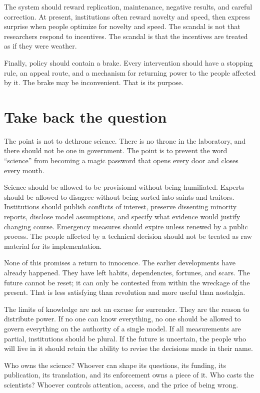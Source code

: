 ﻿\documentclass[12pt,a4paper]{book}
\begin{document}
The system should reward replication, maintenance, negative results, and
careful correction. At present, institutions often reward novelty and speed,
then express surprise when people optimize for novelty and speed. The scandal
is not that researchers respond to incentives. The scandal is that the
incentives are treated as if they were weather.

Finally, policy should contain a brake. Every intervention should have a
stopping rule, an appeal route, and a mechanism for returning power to the
people affected by it. The brake may be inconvenient. That is its purpose.

\section{Take back the question}

The point is not to dethrone science. There is no throne in the laboratory,
and there should not be one in government. The point is to prevent the word
``science'' from becoming a magic password that opens every door and closes
every mouth.

Science should be allowed to be provisional without being humiliated. Experts
should be allowed to disagree without being sorted into saints and traitors.
Institutions should publish conflicts of interest, preserve dissenting
minority reports, disclose model assumptions, and specify what evidence would
justify changing course. Emergency measures should expire unless renewed by a
public process. The people affected by a technical decision should not be
treated as raw material for its implementation.

None of this promises a return to innocence. The earlier developments have
already happened. They have left habits, dependencies, fortunes, and scars.
The future cannot be reset; it can only be contested from within the wreckage
of the present. That is less satisfying than revolution and more useful than
nostalgia.

The limits of knowledge are not an excuse for surrender. They are the reason
to distribute power. If no one can know everything, no one should be allowed
to govern everything on the authority of a single model. If all measurements
are partial, institutions should be plural. If the future is uncertain, the
people who will live in it should retain the ability to revise the decisions
made in their name.

Who owns the science? Whoever can shape its questions, its funding, its
publication, its translation, and its enforcement owns a piece of it. Who
casts the scientists? Whoever controls attention, access, and the price of
being wrong.
\end{document}
